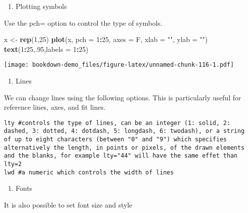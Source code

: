 \documentclass[]{book}
\newenvironment{Shaded}{\begin{snugshade}}{\end{snugshade}}
\newcommand{\KeywordTok}[1]{\textcolor[rgb]{0.13,0.29,0.53}{\textbf{#1}}}
\newcommand{\DataTypeTok}[1]{\textcolor[rgb]{0.13,0.29,0.53}{#1}}
\newcommand{\DecValTok}[1]{\textcolor[rgb]{0.00,0.00,0.81}{#1}}
\newcommand{\StringTok}[1]{\textcolor[rgb]{0.31,0.60,0.02}{#1}}
\newcommand{\OperatorTok}[1]{\textcolor[rgb]{0.81,0.36,0.00}{\textbf{#1}}}
\newcommand{\NormalTok}[1]{#1}
\providecommand{\tightlist}{%
  \setlength{\itemsep}{0pt}\setlength{\parskip}{0pt}}
\theoremstyle{definition}
\theoremstyle{definition}
\theoremstyle{definition}
\theoremstyle{remark}
\begin{document}
\begin{enumerate}
\def\labelenumi{(\arabic{enumi})}
\setcounter{enumi}{1}
\tightlist
\item
  Plotting symbols
\end{enumerate}

Use the pch= option to control the type of symbols.

\begin{Shaded}
\begin{Highlighting}[]
\NormalTok{x <-}\StringTok{ }\KeywordTok{rep}\NormalTok{(}\DecValTok{1}\NormalTok{,}\DecValTok{25}\NormalTok{)}
\KeywordTok{plot}\NormalTok{(x, }\DataTypeTok{pch =} \DecValTok{1}\OperatorTok{:}\DecValTok{25}\NormalTok{, }\DataTypeTok{axes =}\NormalTok{ F, }\DataTypeTok{xlab =} \StringTok{""}\NormalTok{, }\DataTypeTok{ylab =} \StringTok{""}\NormalTok{)}
\KeywordTok{text}\NormalTok{(}\DecValTok{1}\OperatorTok{:}\DecValTok{25}\NormalTok{,.}\DecValTok{95}\NormalTok{,}\DataTypeTok{labels =} \DecValTok{1}\OperatorTok{:}\DecValTok{25}\NormalTok{)}
\end{Highlighting}
\end{Shaded}

\texttt{[image: bookdown-demo\_files/figure-latex/unnamed-chunk-116-1.pdf]}

\begin{enumerate}
\def\labelenumi{(\arabic{enumi})}
\setcounter{enumi}{2}
\tightlist
\item
  Lines
\end{enumerate}

We can change lines using the following options. This is particularly
useful for reference lines, axes, and fit lines.

\begin{verbatim}
lty #controls the type of lines, can be an integer (1: solid, 2: dashed, 3: dotted, 4: dotdash, 5: longdash, 6: twodash), or a string of up to eight characters (between "0" and "9") which specifies alternatively the length, in points or pixels, of the drawn elements and the blanks, for example lty="44" will have the same effet than lty=2
lwd #a numeric which controls the width of lines
\end{verbatim}

\begin{enumerate}
\def\labelenumi{(\arabic{enumi})}
\setcounter{enumi}{3}
\tightlist
\item
  Fonts
\end{enumerate}

It is also possible to set font size and style
\end{document}
